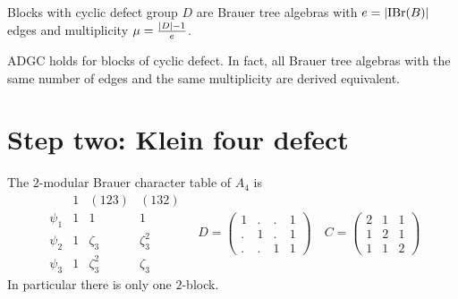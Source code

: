 \documentclass[fontsize=11pt,fleqn,a4paper]{scrartcl}
\begin{document}
\begin{theorem}
Blocks with cyclic defect group $D$ are Brauer tree algebras with $e=\lvert\operatorname{IBr}(B)\rvert$ edges and multiplicity $\mu = \frac{\lvert D\rvert-1}{e}$.
\end{theorem}

\begin{theorem}[Rickard]
ADGC holds for blocks of cyclic defect. In fact, all Brauer tree algebras with the same number of edges and the same multiplicity are derived equivalent.
\end{theorem}

\section{Step two: Klein four defect}

\begin{theorem}
The $2$-modular Brauer character table of $A_4$ is
\[\begin{array}{c|ccc}
 & 1 & (123) & (132) \\
\hline\hline
\psi_1 & 1 & 1 & 1 \\
\psi_2 & 1 & \zeta_3 & \zeta_3^2 \\
\psi_3 & 1 & \zeta_3^2 & \zeta_3
\end{array} \quad
D=\begin{pmatrix}
1 & . & . & 1 \\
. & 1 & . & 1 \\
. & . & 1 & 1
\end{pmatrix}
\quad
C=\begin{pmatrix}
2 & 1 & 1 \\
1 & 2 & 1 \\
1 & 1 & 2 
\end{pmatrix}\]
In particular there is only one $2$-block.
\end{theorem}
\end{document}
